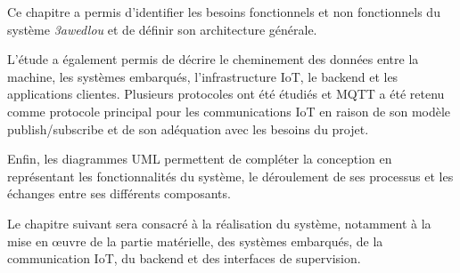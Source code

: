 Ce chapitre a permis d'identifier les besoins fonctionnels et non
fonctionnels du système \textit{3awedlou} et de définir son architecture
générale.

L'étude a également permis de décrire le cheminement des données entre la
machine, les systèmes embarqués, l'infrastructure IoT, le backend et les
applications clientes. Plusieurs protocoles ont été étudiés et MQTT a été
retenu comme protocole principal pour les communications IoT en raison de
son modèle publish/subscribe et de son adéquation avec les besoins du
projet.

Enfin, les diagrammes UML permettent de compléter la conception en
représentant les fonctionnalités du système, le déroulement de ses
processus et les échanges entre ses différents composants.

Le chapitre suivant sera consacré à la réalisation du système, notamment
à la mise en œuvre de la partie matérielle, des systèmes embarqués, de la
communication IoT, du backend et des interfaces de supervision.
